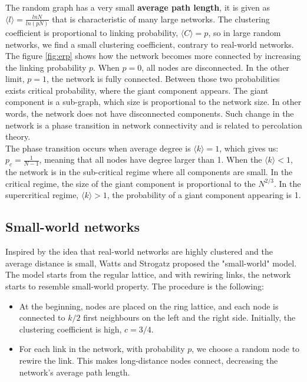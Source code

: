 The random graph has a very small \textbf{average path length}, it is given as $\langle l \rangle = \frac{ln N}{ln(pN)}$ that is characteristic of many large networks. The clustering coefficient is proportional to linking probability, $\langle C \rangle = p$, so in large random networks, we find a small clustering coefficient, contrary to real-world networks. \\  %

The figure \ref{fig:erp} shows how the network becomes more connected by increasing the linking probability $p$. When $p=0$, all nodes are disconnected. In the other limit, $p=1$, the network is fully connected. Between those two probabilities exists critical probability, where the giant component appears. The giant component is a sub-graph, which size is proportional to the network size. In other words, the network does not have disconnected components. Such change in the network is a phase transition in network connectivity and is related to percolation theory. \\

The phase transition occurs when average degree is $ \langle k  \rangle = 1$, which gives us: $p_c = \frac{1}{N-1}$, meaning that all nodes have degree larger than 1. When the $ \langle k  \rangle < 1$, the network is in the sub-critical regime where all components are small. In the critical regime, the size of the giant component is proportional to the $N^{2/3}$. In the supercritical regime, $ \langle k  \rangle > 1$, the probability of a giant component appearing is 1.

\subsection{Small-world networks}

Inspired by the idea that real-world networks are highly clustered and the average distance is small, Watts and Strogatz proposed the "small-world" model. The model starts from the regular lattice, and with rewiring links, the network starts to resemble small-world property. The procedure is the following:

\begin{itemize}
	\item At the beginning, nodes are placed on the ring lattice, and each node is connected to $k/2$ first neighbours on the left and the right side. Initially, the clustering coefficient is high, $c=3/4$. 
	\item For each link in the network, with probability $p$, we choose a random node to rewire the link. This makes long-distance nodes connect, decreasing the network's average path length. 
\end{itemize}

